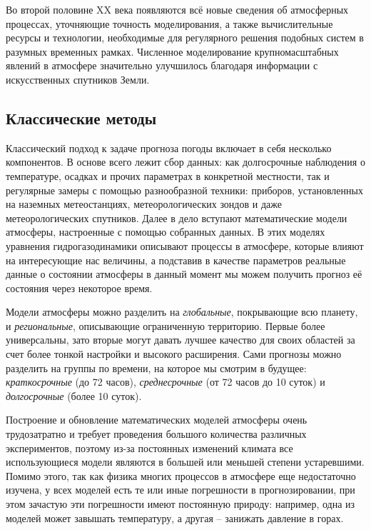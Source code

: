\documentclass[14pt]{matmex-diploma}
\begin{document}
Во второй половине XX века появляются всё новые сведения об атмосферных процессах, уточняющие точность моделирования, а также вычислительные ресурсы и технологии, необходимые для регулярного решения подобных систем в разумных временных рамках. Численное моделирование крупномасштабных явлений в атмосфере значительно улучшилось благодаря информации с искусственных спутников Земли\cite{васильев2008прогноз}.

\subsection{Классические методы}

% 

Классический подход к задаче прогноза погоды включает в себя несколько компонентов. В основе всего лежит сбор данных: как долгосрочные наблюдения о температуре, осадках и прочих параметрах в конкретной местности, так и регулярные замеры с помощью разнообразной техники: приборов, установленных на наземных метеостанциях, метеорологических зондов и даже метеорологических спутников. Далее в дело вступают математические модели атмосферы, настроенные с помощью собранных данных. В этих моделях уравнения гидрогазодинамики описывают процессы в атмосфере, которые влияют на интересующие нас величины, а подставив в качестве параметров реальные данные о состоянии атмосферы в данный момент мы можем получить прогноз её состояния через некоторое время.

Модели атмосферы можно разделить на \textit{глобальные}, покрывающие всю планету, и \textit{региональные}, описывающие ограниченную территорию. Первые более универсальны, зато вторые могут давать лучшее качество для своих областей за счет более тонкой настройки и высокого расширения. Сами прогнозы можно разделить на группы по времени, на которое мы смотрим в будущее: \textit{краткосрочные} (до 72 часов), \textit{среднесрочные} (от 72 часов до 10 суток) и \textit{долгосрочные} (более 10 суток).

Построение и обновление математических моделей атмосферы очень трудозатратно и требует проведения большого количества различных экспериментов, поэтому из-за постоянных изменений климата все использующиеся модели являются в большей или меньшей степени устаревшими. Помимо этого, так как физика многих процессов в атмосфере еще недостаточно изучена, у всех моделей есть те или иные погрешности в прогнозировании, при этом зачастую эти погрешности имеют постоянную природу: например, одна из моделей может завышать температуру, а другая -- занижать давление в горах. 
\end{document}
